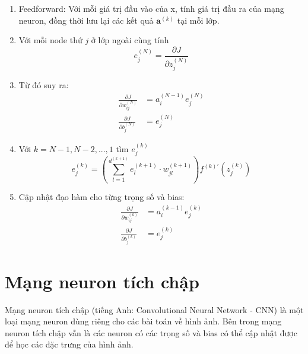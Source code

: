 \begin{enumerate}
	\item Feedforward: Với mỗi giá trị đầu vào của x, tính giá trị đầu ra của mạng neuron, đồng thời lưu lại các kết quả ${\boldsymbol{a}}^{(k)}$ tại mỗi lớp.
	\item Với mỗi node thứ $j$ ở lớp ngoài cùng tính
\begin{equation}
	{e_{j}^{(N)}}
	=
	\frac
		{ {\partial} J }
		{ {\partial} {z_{j}^{(N)}} }
\end{equation}
	\item Từ đó suy ra:
\begin{align*}
	\frac
		{ {\partial} J }
		{ {\partial} {w_{ij}^{(N)}} }
	&=
	{a_{i}^{(N-1)}}
	{e_{j}^{(N)}} \\
	\frac
		{ {\partial} J }
		{ {\partial} {b_{j}^{(N)}} }
	&=
	{ e_{j}^{(N)} }
\end{align*}
	\item Với $k=N-1,N-2,...,1$ tìm $e_{j}^{(k)}$
\begin{equation}
	e_{j}^{(k)}
	=
	\left( 
		{\sum_{l=1}^{d^{(k+1)}}}
		e_{l}^{(k+1)}
		{\cdot}
		w_{jl}^{(k+1)}
	\right) 
	{
		{f^{(k)'}} 
		\left( 
			{z_{j}^{(k)}} 
	 	\right)
	}
\end{equation}
	\item Cập nhật đạo hàm cho từng trọng số và bias:
\begin{align*}
	\frac
		{ {\partial} J }
		{ {\partial} {w_{ij}^{(k)}} }
	&=
	{a_{i}^{(k-1)}}
	{e_{j}^{(k)}} \\
	\frac
	{ {\partial} J }
		{ {\partial} {b_{j}^{(k)}} }
	&=
	{ e_{j}^{(k)} }
\end{align*}
\end{enumerate}
\section{Mạng neuron tích chập\cite{ref:3}\cite{ref:4}}
Mạng neuron tích chập (tiếng Anh: Convolutional Neural Network - CNN) là một loại mạng neuron dùng riêng cho các bài toán về hình ảnh. Bên trong mạng neuron tích chập vẫn là các neuron có các trọng số và bias có thể cập nhật được để học các đặc trưng của hình ảnh.


